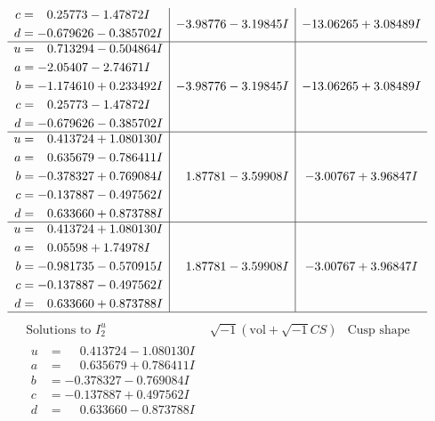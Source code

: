 \documentclass[1p]{elsarticle_modified}
\theoremstyle{definition}
\newcommand{\I}{\sqrt{-1}}
\begin{document}
$$\begin{array}{c|c|c}
\begin{aligned}
c &= \phantom{-}0.25773 - 1.47872 I \\
d &= -0.679626 - 0.385702 I\end{aligned}
 & -3.98776 - 3.19845 I & -13.06265 + 3.08489 I \\ \hline\begin{aligned}
u &= \phantom{-}0.713294 - 0.504864 I \\
a &= -2.05407 - 2.74671 I \\
b &= -1.174610 + 0.233492 I \\
c &= \phantom{-}0.25773 - 1.47872 I \\
d &= -0.679626 - 0.385702 I\end{aligned}
 & -3.98776 - 3.19845 I & -13.06265 + 3.08489 I \\ \hline\begin{aligned}
u &= \phantom{-}0.413724 + 1.080130 I \\
a &= \phantom{-}0.635679 - 0.786411 I \\
b &= -0.378327 + 0.769084 I \\
c &= -0.137887 - 0.497562 I \\
d &= \phantom{-}0.633660 + 0.873788 I\end{aligned}
 & \phantom{-}1.87781 - 3.59908 I & -3.00767 + 3.96847 I \\ \hline\begin{aligned}
u &= \phantom{-}0.413724 + 1.080130 I \\
a &= \phantom{-}0.05598 + 1.74978 I \\
b &= -0.981735 - 0.570915 I \\
c &= -0.137887 - 0.497562 I \\
d &= \phantom{-}0.633660 + 0.873788 I\end{aligned}
 & \phantom{-}1.87781 - 3.59908 I & -3.00767 + 3.96847 I\\
 \hline 
 \end{array}$$\newpage$$\begin{array}{c|c|c}  
\text{Solutions to }I^u_{2}& \I (\text{vol} + \sqrt{-1}CS) & \text{Cusp shape}\\
 \hline 
\begin{aligned}
u &= \phantom{-}0.413724 - 1.080130 I \\
a &= \phantom{-}0.635679 + 0.786411 I \\
b &= -0.378327 - 0.769084 I \\
c &= -0.137887 + 0.497562 I \\
d &= \phantom{-}0.633660 - 0.873788 I\end{aligned}

\end{array}$$
\end{document}
